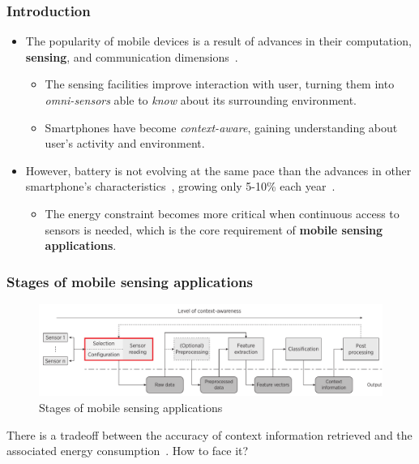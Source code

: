 \documentclass[compress,9pt,xcolor={dvipsnames,table}]{beamer}
\begin{document}
\begin{frame}[t]\frametitle{Introduction}
\begin{itemize}
  \item The popularity of mobile devices is a result of advances in their computation, \textbf{sensing}, and communication dimensions~\cite{Islam2014}.
  \begin{itemize}
    \item The sensing facilities improve interaction with user, turning them into \emph{omni-sensors} able to \emph{know} about its surrounding environment.
    \item Smartphones have become \emph{context-aware}, gaining understanding about user's activity and environment.
  \end{itemize}
  \item However, battery is not evolving at the same pace than the advances in other smartphone's characteristics~\cite{Kjaergaard2012}, growing only 5-10\% each year~\cite{Ma2012,Evarts2015}.
  \begin{itemize}
    \item The energy constraint becomes more critical when continuous access to sensors is needed, which is the core requirement of \textbf{mobile sensing applications}. 
  \end{itemize}
\end{itemize}
\end{frame}

\begin{frame}[t]\frametitle{Stages of mobile sensing applications}
\begin{figure}[tb]
  \centering
  \includegraphics[width=\textwidth]{../../../resources/images/vectors/msa-stages}
  \caption{Stages of mobile sensing applications}
  \label{fig:msa-stages}
\end{figure}
There is a tradeoff between the accuracy of context information retrieved and the associated energy consumption~\cite{Sim2014,Rachuri2012}.
How to face it?
\end{frame}
\end{document}
